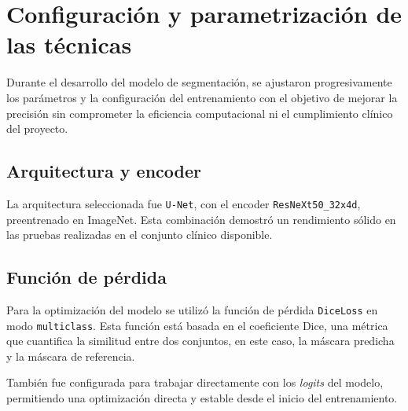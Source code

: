 \section{Configuración y parametrización de las técnicas}

Durante el desarrollo del modelo de segmentación, se ajustaron progresivamente los parámetros y la configuración del entrenamiento con el objetivo de mejorar la precisión sin comprometer la eficiencia computacional ni el cumplimiento clínico del proyecto.

\subsection{Arquitectura y encoder} 

La arquitectura seleccionada fue \texttt{U-Net}, con el encoder \texttt{ResNeXt50\_32x4d}, preentrenado en ImageNet. Esta combinación demostró un rendimiento sólido en las pruebas realizadas en el conjunto clínico disponible.

\subsection{Función de pérdida}
Para la optimización del modelo se utilizó la función de pérdida \texttt{DiceLoss} en modo \texttt{multiclass}. Esta función está basada en el coeficiente Dice, una métrica que cuantifica la similitud entre dos conjuntos, en este caso, la máscara predicha y la máscara de referencia.

También fue configurada para trabajar directamente con los \textit{logits} del modelo, permitiendo una optimización directa y estable desde el inicio del entrenamiento.

